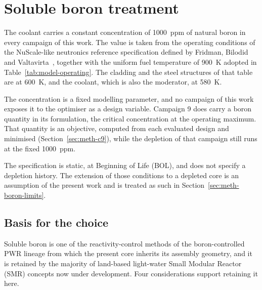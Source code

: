 \section{Soluble boron treatment}
\label{sec:meth-boron}

The coolant carries a constant concentration of \SI{1000}{ppm} of
natural boron in every campaign of this work. The value is taken from
the operating conditions of the NuScale-like neutronics reference specification
defined by Fridman, Bilodid and
Valtavirta~\cite{fridman_nuscale_benchmark_2023}, together with the
uniform fuel temperature of \SI{900}{\kelvin} adopted in
Table~\ref{tab:model-operating}. The cladding and the steel structures
of that table are at \SI{600}{\kelvin}, and the coolant, which is also
the moderator, at \SI{580}{\kelvin}.

The concentration is a fixed modelling parameter, and no campaign of
this work exposes it to the optimiser as a design variable. Campaign 9 does carry a boron
quantity in its formulation, the critical concentration at the
operating maximum. That quantity is an objective, computed from each
evaluated design and minimised (Section~\ref{sec:meth-c9}), while the
depletion of that campaign still runs at the fixed \SI{1000}{ppm}.

The specification is static, at Beginning of Life (BOL), and does not
specify a depletion history. The extension of those
conditions to a depleted core is an assumption of the present work and
is treated as such in Section~\ref{sec:meth-boron-limits}.

\subsection{Basis for the choice}
\label{sec:meth-boron-basis}

Soluble boron is one of the reactivity-control methods of the boron-controlled
PWR lineage from which the present core
inherits its assembly geometry, and it is retained by the majority of
land-based light-water Small Modular Reactor (SMR) concepts now under
development. Four considerations support retaining it here.

